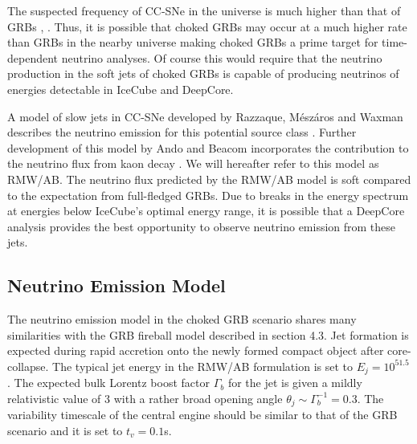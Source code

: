 \documentclass{gatech-thesis}
\begin{document}
The suspected frequency of CC-SNe in the universe is much higher than that of GRBs \cite{0004-637X-738-2-154}, \cite{2004RvMP...76.1143P}. Thus, it is possible that choked GRBs may occur at a much higher rate than GRBs in the nearby universe making choked GRBs a prime target for time-dependent neutrino analyses. Of course this would require that the neutrino production in the soft jets of choked GRBs is capable of producing neutrinos of energies detectable in IceCube and DeepCore.

A model of slow jets in CC-SNe developed by Razzaque, M\'{e}sz\'{a}ros and Waxman describes the neutrino emission for this potential source class \cite{2004PhRvL..93r1101R}. Further development of this model by Ando and Beacom incorporates the contribution to the neutrino flux from kaon decay \cite{2005PhRvL..95f1103A}. We will hereafter refer to this model as RMW/AB. The neutrino flux predicted by the RMW/AB model is soft compared to the expectation from full-fledged GRBs. Due to breaks in the energy spectrum at energies below IceCube's optimal energy range, it is possible that a DeepCore analysis provides the best opportunity to observe neutrino emission from these jets.

\subsection{Neutrino Emission Model}
The neutrino emission model in the choked GRB scenario shares many similarities with the GRB fireball model described in section 4.3. Jet formation is expected during rapid accretion onto the newly formed compact object after core-collapse. The typical jet energy in the RMW/AB formulation is set to $E_j=10^{51.5}$. The expected bulk Lorentz boost factor $\Gamma_b$ for the jet is given a mildly relativistic value of 3 with a rather broad opening angle $\theta_j \sim \Gamma_b^{-1}=0.3$. The variability timescale of the  central engine should be similar to that of the GRB scenario and it is set to $t_v = 0.1$s.
\end{document}
